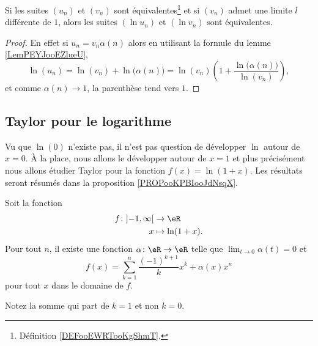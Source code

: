 \begin{lemma}
    Si les suites \( (u_n)\) et \( (v_n)\) sont équivalentes\footnote{Définition \ref{DEFooEWRTooKgShmT}.} et si \( (v_n)\) admet une limite \( l\) différente de \( 1\), alors les suites \( (\ln u_n)\) et \( (\ln v_n)\) sont équivalentes.
\end{lemma}

\begin{proof}
    En effet si \( u_n=v_n\alpha(n)\) alors en utilisant la formule du lemme \ref{LemPEYJooEZlueU},
    \begin{equation}
        \ln(u_n)=\ln(v_n)+\ln\big( \alpha(n) \big)=\ln(v_n)\left( 1+\frac{ \ln\big( \alpha(n) \big) }{ \ln(v_n) } \right),
    \end{equation}
    et comme \( \alpha(n)\to 1\), la parenthèse tend vers \( 1\).
\end{proof}

\subsection{Taylor pour le logarithme}

Vu que \( \ln(0)\) n'existe pas, il n'est pas question de développer \( \ln\) autour de \( x=0\). À la place, nous allons le développer autour de \( x=1\) et plus précisément nous allons étudier Taylor pour la fonction \( f(x)=\ln(1+x)\). Les résultats seront résumés dans la proposition \ref{PROPooKPBIooJdNsqX}.

\begin{proposition}     \label{PROPooWCUEooJudkCV}
    Soit la fonction
    \begin{equation}
        \begin{aligned}
        f\colon \mathopen] -1 , \infty \mathclose[&\to \eR \\
            x&\mapsto \ln(1+x). 
        \end{aligned}
    \end{equation}
    Pour tout \( n\), il existe une fonction \( \alpha\colon \eR\to \eR\) telle que \( \lim_{t\to 0} \alpha(t)=0\) et
    \begin{equation}
        f(x)=\sum_{k=1}^n\frac{ (-1)^{k+1} }{ k }x^k+\alpha(x)x^n
    \end{equation}
    pour tout \( x\) dans le domaine de \( f\).

    Notez la somme qui part de \( k=1\) et non \( k=0\).
\end{proposition}


